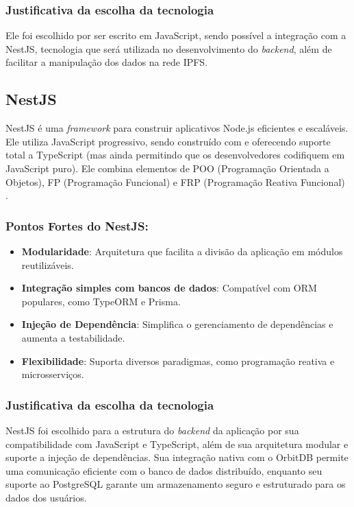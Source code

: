 \subsubsection{Justificativa da escolha da tecnologia}
Ele foi escolhido por ser escrito em JavaScript, sendo possível a integração com a NestJS, tecnologia que será utilizada no desenvolvimento do \textit{backend}, além de facilitar a manipulação dos dados na rede IPFS.

\subsection{NestJS}

NestJS é uma \textit{framework} para construir aplicativos Node.js eficientes e escaláveis. Ele utiliza JavaScript progressivo, sendo construído com e oferecendo suporte total a TypeScript (mas ainda permitindo que os desenvolvedores codifiquem em JavaScript puro). Ele combina elementos de POO (Programação Orientada a Objetos), FP (Programação Funcional) e FRP (Programação Reativa Funcional) \cite{nestjs2025}.

\subsubsection*{Pontos Fortes do NestJS:}
\begin{itemize}
    \item \textbf{Modularidade}: Arquitetura que facilita a divisão da aplicação em módulos reutilizáveis.
    \item \textbf{Integração simples com bancos de dados}: Compatível com ORM populares, como TypeORM e Prisma.
    \item \textbf{Injeção de Dependência}: Simplifica o gerenciamento de dependências e aumenta a testabilidade.
    \item \textbf{Flexibilidade}: Suporta diversos paradigmas, como programação reativa e microsserviços.
\end{itemize}

\subsubsection{Justificativa da escolha da tecnologia}
NestJS foi escolhido para a estrutura do \textit{backend} da aplicação por sua compatibilidade com JavaScript e TypeScript, além de sua arquitetura modular e suporte a injeção de dependências. Sua integração nativa com o OrbitDB permite uma comunicação eficiente com o banco de dados distribuído, enquanto seu suporte ao PostgreSQL garante um armazenamento seguro e estruturado para os dados dos usuários.

